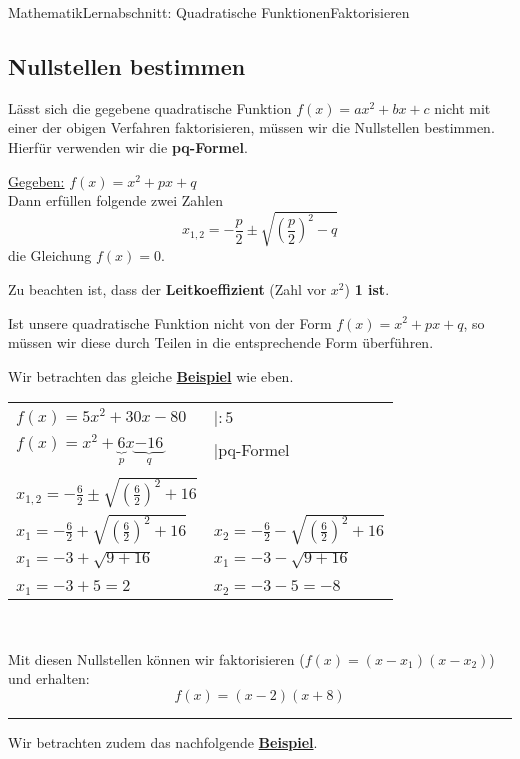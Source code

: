\documentclass[11pt,twocolumn,oneside,openany,headings=optiontotoc,11pt,numbers=noenddot]{article}
\begin{document}
\begin{worksheet}{Mathematik}{Lernabschnitt: Quadratische Funktionen}{Faktorisieren}
		\subsection{Nullstellen bestimmen}
		Lässt sich die gegebene quadratische Funktion \(f(x) = ax^2 + bx + c\) nicht mit einer der obigen Verfahren faktorisieren, müssen wir die Nullstellen bestimmen.\\
		Hierfür verwenden wir die \textbf{pq-Formel}.
		\begin{framed}
			\noindent
			\underline{Gegeben:} \(f(x) = x^2 + px + q\)\\
			Dann erfüllen folgende zwei Zahlen \[x_{1,2}=-\frac{p}{2} \pm \sqrt{\left(\frac{p}{2}\right)^2 - q}\] die Gleichung \(f(x) = 0\).\\
			\par\noindent
			Zu beachten ist, dass der \textbf{Leitkoeffizient} (Zahl vor \(x^2\)) \textbf{1 ist}.
		\end{framed}
		Ist unsere quadratische Funktion nicht von der Form \(f(x) = x^2 + px + q\), so müssen wir diese durch Teilen in die entsprechende Form überführen.\\
		\par\noindent
		Wir betrachten das gleiche \underline{\textbf{Beispiel}} wie eben.\\
		\par\noindent
		\begin{tabularx}{0.5\textwidth}{Xl}
			\(f(x) = 5x^2 + 30x - 80\) & |\(:5\)\\
			\(f(x) = x^2 + \underbrace{6}_{p}x \underbrace{- 16}_{q}\) & |pq-Formel\\
			\\
			\(x_{1,2} = -\frac{6}{2} \pm \sqrt{\left(\frac{6}{2}\right)^2 +16}\)\\
			\(x_1 = -\frac{6}{2} + \sqrt{\left(\frac{6}{2}\right)^2 +16}\) & \(x_2 = -\frac{6}{2} - \sqrt{\left(\frac{6}{2}\right)^2 +16}\)\\
			\(x_1 = - 3 + \sqrt{9 + 16}\) & \(x_1 = - 3 - \sqrt{9 + 16}\)\\
			\\
			\colorbox{green!10}{\(x_1 = -3 + 5 = 2\)} & \colorbox{green!10}{\(x_2 = -3 - 5 = -8\)}
		\end{tabularx}\\
		\par\noindent
		Mit diesen Nullstellen können wir faktorisieren (\(f(x) = (x-x_1)(x-x_2)\)) und erhalten:
		\[f(x) = (x-2)(x+8)\]
		\rule{0.45\textwidth}{0.1pt}
		Wir betrachten zudem das nachfolgende \underline{\textbf{Beispiel}}.\\

\end{worksheet}
\end{document}
